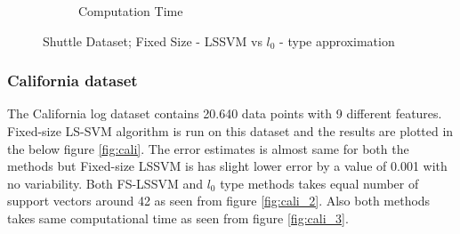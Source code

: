 \begin{figure}[!htpb]
\begin{subfigure}[b]{0.34\textwidth}
		\caption{Computation Time}\label{fig:shuttle_3}
	\end{subfigure}%
	\caption{Shuttle Dataset; Fixed Size - LSSVM vs $l_0$ - type approximation}
	\label{fig:shuttle}
\end{figure}

\subsubsection{ California dataset}
The California log dataset contains 20.640 data points with 9 different features. Fixed-size LS-SVM algorithm is run on this dataset and the results are plotted in the below figure \ref{fig:cali}. The error estimates is almost same for both the methods but Fixed-size LSSVM is has slight lower error by a value of 0.001 with no variability. Both FS-LSSVM and $l_0$ type methods takes equal number of support vectors around 42  as seen from figure \ref{fig:cali_2}. Also both methods takes same computational time as seen from figure \ref{fig:cali_3}. 
